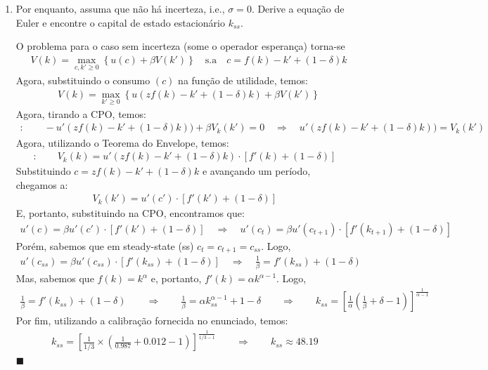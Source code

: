 \documentclass[10pt]{article}
\newcommand*{\QEDA}{\hfill\ensuremath{\blacksquare}}%
\newcommand\0{\mathbf{0}}
\newcounter{exercise}
\newcounter{problem}[exercise]
\newenvironment{sol}
    {\\[1em] {\color{magenta}\text{Resposta.}}
    }
    {{\color{blue!50!black}\QEDA}}
\begin{document}
\begin{enumerate}[wide]
\item Por enquanto, assuma que não há incerteza, i.e., $\sigma = 0$. Derive a equação de Euler e encontre o capital de estado estacionário $k_{ss}$.
\begin{sol}
O problema para o caso sem incerteza (some o operador esperança) torna-se 
\begin{align*}
&V(k) = \max_{c, k' \geq 0} \left\{  u(c) + \beta V(k') \right\} \quad \text{s.a} \quad  c = f(k) - k' + (1-\delta) k 
\end{align*}
Agora, substituindo o consumo $(c)$ na função de utilidade, temos: 
\begin{align*}
&V(k) = \max_{k' \geq 0} \left\{  u(zf(k) - k' + (1-\delta) k ) + \beta V(k') \right\} 
\end{align*}
Agora, tirando a CPO, temos:
\begin{align*}
[k']: \qquad - u'(zf(k) - k' + (1-\delta) k )) + \beta V_k(k') = 0 \quad \Rightarrow \quad  \boxed{u'(zf(k) - k' + (1-\delta) k ))  = V_k(k')}
\end{align*}
Agora, utilizando o Teorema do Envelope, temos:
\begin{align*}
[k]: \qquad V_k(k) = u'(zf(k) - k' + (1-\delta) k )\cdot [f'(k) + (1-\delta)] 
\end{align*}
Substituindo $c = zf(k) - k' + (1-\delta) k$ e avançando um período, chegamos a: 
\begin{align*}
V_k(k') = u'(c')\cdot [f'(k') + (1-\delta)] 
\end{align*}
E, portanto, substituindo na CPO, encontramos que:
\begin{align*}
u'(c)  = \beta u'(c')\cdot [f'(k') + (1-\delta)] \quad \Rightarrow \quad \boxed{u'(c_t) = \beta u'(c_{t+1}) \cdot [f'(k_{t+1}) + (1-\delta)]}
\end{align*}
Porém, sabemos que em steady-state (ss) $c_t = c_{t+1} = c_{ss}$. Logo, 
\begin{align*}
u'({c}_{ss}) = \beta u'({c}_{ss}) \cdot [f'({k}_{ss}) + (1-\delta)] \quad \Rightarrow \quad \boxed{\frac{1}{\beta} = f'(k_{ss}) + (1-\delta)}
\end{align*}
Mas, sabemos que $f(k) = k^\alpha$ e, portanto, $f'(k) = \alpha k^{\alpha - 1}$. Logo,
\begin{align*}
\frac{1}{\beta} = f'(k_{ss}) + (1-\delta) \qquad \Rightarrow \qquad \frac{1}{\beta} = \alpha k_{ss}^{\alpha - 1} + 1 - \delta \qquad \Rightarrow \qquad \boxed{k_{ss} = \left[\frac{1}{\alpha}\left(\frac{1}{\beta} + \delta - 1\right)\right]^{\frac{1}{\alpha - 1}}} 
\end{align*}
Por fim, utilizando a calibração fornecida no enunciado, temos: 
\begin{align*}
k_{ss} = \left[\frac{1}{1/3} \times \left(\frac{1}{0.987} + 0.012 - 1\right)\right]^{\frac{1}{1/3 - 1}} \qquad \Rightarrow \qquad \boxed{k_{ss} \approx 48.19}
\end{align*}
\end{sol}


\end{enumerate}
\end{document}
